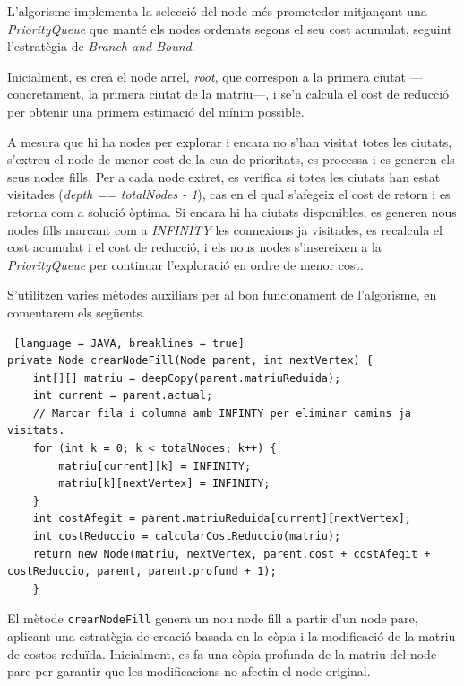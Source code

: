 \documentclass{ieeetj}
\begin{document}
L'algorisme implementa la selecció del node més prometedor mitjançant una \textit{PriorityQueue} que manté els nodes ordenats segons el seu cost acumulat, seguint l'estratègia de \textit{Branch-and-Bound}.\newline

Inicialment, es crea el node arrel, \textit{root}, que correspon a la primera ciutat —concretament, la primera ciutat de la matriu—, i se'n calcula el cost de reducció per obtenir una primera estimació del mínim possible. \newline


A mesura que hi ha nodes per explorar i encara no s'han visitat totes les ciutats, s'extreu el node de menor cost de la cua de prioritats, es processa i es generen els seus nodes fills. Per a cada node extret, es verifica si totes les ciutats han estat visitades (\textit{depth == totalNodes - 1}), cas en el qual s'afegeix el cost de retorn i es retorna com a solució òptima. Si encara hi ha ciutats disponibles, es generen nous nodes fills marcant com a \textit{INFINITY} les connexions ja visitades, es recalcula el cost acumulat i el cost de reducció, i els nous nodes s'insereixen a la \textit{PriorityQueue} per continuar l'exploració en ordre de menor cost.

S'utilitzen varies mètodes auxiliars per al bon funcionament de l'algorisme, en comentarem els següents.

\begin{lstlisting} [language = JAVA, breaklines = true]
private Node crearNodeFill(Node parent, int nextVertex) {
    int[][] matriu = deepCopy(parent.matriuReduida);
    int current = parent.actual; 
    // Marcar fila i columna amb INFINTY per eliminar camins ja visitats.
    for (int k = 0; k < totalNodes; k++) {
        matriu[current][k] = INFINITY;
        matriu[k][nextVertex] = INFINITY;
    }
    int costAfegit = parent.matriuReduida[current][nextVertex];
    int costReduccio = calcularCostReduccio(matriu);
    return new Node(matriu, nextVertex, parent.cost + costAfegit + costReduccio, parent, parent.profund + 1);
    }    
\end{lstlisting}
El mètode \texttt{crearNodeFill} genera un nou node fill a partir d'un node pare, aplicant una estratègia de creació basada en la còpia i la modificació de la matriu de costos reduïda. \newline
Inicialment, es fa una còpia profunda de la matriu del node pare per garantir que les modificacions no afectin el node original.\newline 
\end{document}
